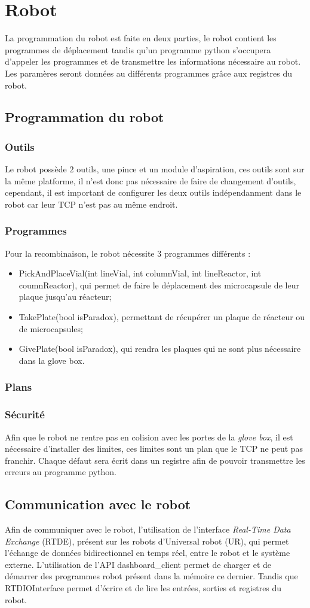 \section{Robot}
La programmation du robot est faite en deux parties, le robot contient les programmes de déplacement 
tandis qu'un programme python s'occupera d'appeler les programmes et de transmettre les informations nécessaire au robot.
Les paramères seront données au différents programmes grâce aux registres du robot.
\subsection{Programmation du robot}
\subsubsection{Outils}
Le robot possède $2$ outils, une pince et un module d'aspiration, ces outils sont sur la même platforme, il n'est donc pas nécessaire de faire de changement d'outils, cependant, il est important de configurer les deux outils indépendanment dans le robot car leur TCP n'est pas au même endroit.
\subsubsection{Programmes}
Pour la recombinaison, le robot nécessite $3$ programmes différents :
\begin{itemize}
    \item PickAndPlaceVial(int lineVial, int columnVial, int lineReactor, int coumnReactor), qui permet de faire le déplacement des microcapsule de leur plaque jusqu'au réacteur;
    \item TakePlate(bool isParadox), permettant de récupérer un plaque de réacteur ou de microcapsules;
    \item GivePlate(bool isParadox), qui rendra les plaques qui ne sont plus nécessaire dans la glove box.
\end{itemize}
\subsubsection{Plans}
\subsubsection{Sécurité}
Afin que le robot ne rentre pas en colision avec les portes de la \textit{glove box}, il est nécessaire d'installer des limites, ces limites sont un plan que le TCP ne peut pas franchir.
Chaque défaut sera écrit dans un registre afin de pouvoir transmettre les erreurs au programme python.
\subsection{Communication avec le robot}
Afin de communiquer avec le robot, l'utilisation de l'interface \textit{Real-Time Data Exchange} (RTDE), présent sur les robots d'Universal robot (UR), qui permet l'échange de données bidirectionnel en temps réel, entre le robot et le système externe. 
L'utilisation de l'API \og{} dashboard\_client permet \fg{} de charger et de démarrer des programmes robot présent dans la mémoire ce dernier. Tandis que \og{} RTDIOInterface \fg{} permet d'écrire et de lire les entrées, sorties et registres du robot.